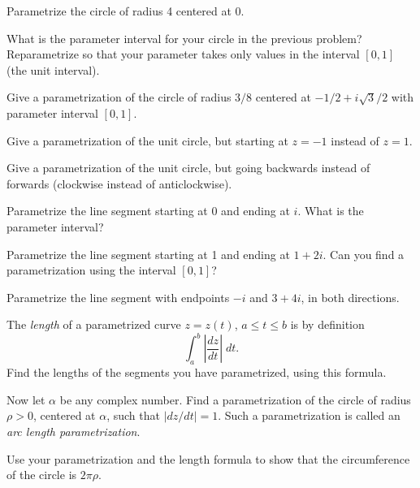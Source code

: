 \documentclass[11pt]{exam}
\begin{document}
\begin{questions}

\question Parametrize the circle of radius 4 centered at 0.


\question What is the parameter interval for your circle in the previous problem? Reparametrize so that your parameter takes only values in the interval $[0,1]$ (the unit interval).


\question Give a parametrization of the circle of radius $3/8$ centered at $-1/2 + i \sqrt{3}/2$ with parameter interval $[0,1]$.


\question Give a parametrization of the unit circle, but starting at $z = -1$ instead of $z = 1$.


\question Give a parametrization of the unit circle, but going backwards instead of forwards (clockwise instead of anticlockwise).

\newpage

\question Parametrize the line segment starting at 0 and ending at $i$. What is the parameter interval?


\question Parametrize the line segment starting at 1 and ending at $1+2i$. Can you find a parametrization using the interval $[0,1]$?


\question Parametrize the line segment with endpoints $-i$ and $3 + 4i$, in both directions. 


\question The \emph{length} of a parametrized curve $z = z(t)$, $a \leq t \leq b$ is by definition
\[
    \int_a^b \left| \frac{dz}{dt} \right| \; dt.
\]
Find the lengths of the segments you have parametrized, using this formula.


\question Now let $\alpha$ be any complex number. Find a parametrization of the circle of radius $\rho > 0$, centered at $\alpha$, such that $|dz/dt| = 1$. Such a parametrization is called an \emph{arc length parametrization}. 


\question Use your parametrization and the length formula to show that the circumference of the circle is $2 \pi \rho$.
\end{questions}
\end{document}
